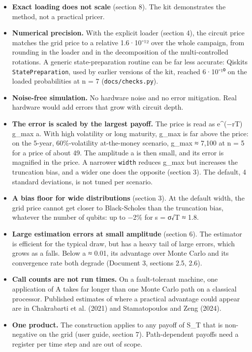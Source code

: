 \documentclass[
  10pt,
]{article}
\providecommand{\tightlist}{%
  \setlength{\itemsep}{0pt}\setlength{\parskip}{0pt}}
\begin{document}
\begin{itemize}
\tightlist
\item
  \textbf{Exact loading does not scale} (section 8). The kit
  demonstrates the method, not a practical pricer.
\item
  \textbf{Numerical precision.} With the explicit loader (section 4),
  the circuit price matches the grid price to a relative 1.6·10⁻¹² over
  the whole campaign, from rounding in the loader and in the
  decomposition of the multi-controlled rotations. A generic
  state-preparation routine can be far less accurate:
  Qiskit\textquotesingle s \texttt{StatePreparation}, used by earlier
  versions of the kit, reached 6·10⁻¹⁰ on the loaded probabilities at n
  = 7 (\texttt{docs/checks.py}).
\item
  \textbf{Noise-free simulation.} No hardware noise and no error
  mitigation. Real hardware would add errors that grow with circuit
  depth.
\item
  \textbf{The error is scaled by the largest payoff.} The price is read
  as e\^{}(−rT) g\_max a. With high volatility or long maturity, g\_max
  is far above the price: on the 5-year, 60\%-volatility at-the-money
  scenario, g\_max ≈ 7,100 at n = 5 for a price of about 49. The
  amplitude a is then small, and its error is magnified in the price. A
  narrower \texttt{width} reduces g\_max but increases the truncation
  bias, and a wider one does the opposite (section 3). The default, 4
  standard deviations, is not tuned per scenario.
\item
  \textbf{A bias floor for wide distributions} (section 3). At the
  default width, the grid price cannot get closer to Black-Scholes than
  the truncation bias, whatever the number of qubits: up to −2\% for s =
  σ√T ≈ 1.8.
\item
  \textbf{Large estimation errors at small amplitude} (section 6). The
  estimator is efficient for the typical draw, but has a heavy tail of
  large errors, which grows as a falls. Below a ≈ 0.01, its advantage
  over Monte Carlo and its convergence rate both degrade (Document 3,
  sections 2.5, 2.6).
\item
  \textbf{Call counts are not run times.} On a fault-tolerant machine,
  one application of A takes far longer than one Monte Carlo path on a
  classical processor. Published estimates of where a practical
  advantage could appear are in Chakrabarti et al. (2021) and
  Stamatopoulos and Zeng (2024).
\item
  \textbf{One product.} The construction applies to any payoff of S\_T
  that is non-negative on the grid (user guide, section 7).
  Path-dependent payoffs need a register per time step and are out of
  scope.
\end{itemize}
\end{document}
